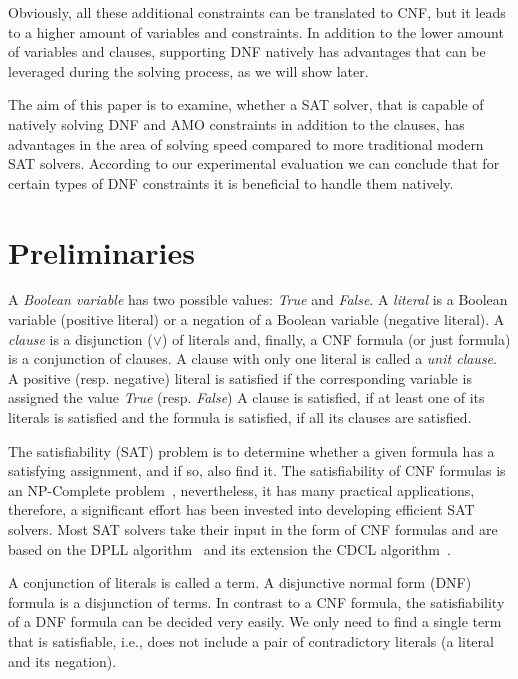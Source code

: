 \documentclass{easychair}
\begin{document}
Obviously, all these additional constraints can be translated to CNF, but it leads to a higher amount of variables and constraints. In addition to the lower amount of variables and clauses, supporting DNF natively has advantages that can be leveraged during the solving process, as we will show later.

The aim of this paper is to examine, whether a SAT solver, that is capable of natively solving DNF and AMO constraints in addition to the clauses, has advantages in the area of solving speed compared to more traditional modern SAT solvers. According to our experimental evaluation we can conclude that for certain types of DNF constraints it is beneficial to handle them natively.


\section{Preliminaries}
A \emph{Boolean variable} has two possible values: \emph{True} and \emph{False}. A \emph{literal} is a Boolean variable (positive literal) or a negation of a Boolean variable (negative literal). A \textit{clause} is a disjunction ($\lor$) of literals and, finally, a CNF formula (or just formula) is a conjunction of clauses.
A clause with only one literal is called a \textit{unit clause}.
A positive (resp. negative) literal is satisfied if the corresponding variable is assigned the value \textit{True} (resp. \textit{False})
A clause is satisfied, if at least one of its literals is satisfied and the formula is satisfied, if all its clauses are satisfied. 

The satisfiability (SAT) problem is to determine whether a given formula has a satisfying assignment, and if so, also find it. The satisfiability of CNF formulas is an NP-Complete problem~\cite{Cook.1971}, nevertheless, it has many practical applications, therefore, a significant effort has been invested into developing efficient SAT solvers. Most SAT solvers take their input in the form of CNF formulas and are based on the DPLL algorithm~\cite{Davis.1962} and its extension the CDCL algorithm~\cite{MarquesSilva.1999,Moskewicz.2001}.

A conjunction of literals is called a term. A disjunctive normal form (DNF) formula is a disjunction of terms. In contrast to a CNF formula, the satisfiability of a DNF formula can be decided very easily. We only need to find a single term that is satisfiable, i.e., does not include a pair of contradictory literals (a literal and its negation).
\end{document}
